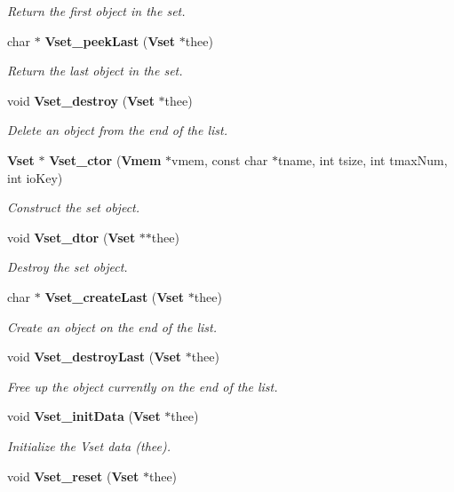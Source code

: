 \begin{DoxyCompactItemize}
\begin{DoxyCompactList}\small\item\em Return the first object in the set. \end{DoxyCompactList}\item 
char $\ast$ {\bf Vset\+\_\+peek\+Last} ({\bf Vset} $\ast$thee)
\begin{DoxyCompactList}\small\item\em Return the last object in the set. \end{DoxyCompactList}\item 
void {\bf Vset\+\_\+destroy} ({\bf Vset} $\ast$thee)
\begin{DoxyCompactList}\small\item\em Delete an object from the end of the list. \end{DoxyCompactList}\item 
{\bf Vset} $\ast$ {\bf Vset\+\_\+ctor} ({\bf Vmem} $\ast$vmem, const char $\ast$tname, int tsize, int tmax\+Num, int io\+Key)
\begin{DoxyCompactList}\small\item\em Construct the set object. \end{DoxyCompactList}\item 
void {\bf Vset\+\_\+dtor} ({\bf Vset} $\ast$$\ast$thee)
\begin{DoxyCompactList}\small\item\em Destroy the set object. \end{DoxyCompactList}\item 
char $\ast$ {\bf Vset\+\_\+create\+Last} ({\bf Vset} $\ast$thee)
\begin{DoxyCompactList}\small\item\em Create an object on the end of the list. \end{DoxyCompactList}\item 
void {\bf Vset\+\_\+destroy\+Last} ({\bf Vset} $\ast$thee)
\begin{DoxyCompactList}\small\item\em Free up the object currently on the end of the list. \end{DoxyCompactList}\item 
void {\bf Vset\+\_\+init\+Data} ({\bf Vset} $\ast$thee)
\begin{DoxyCompactList}\small\item\em Initialize the Vset data (thee). \end{DoxyCompactList}\item 
void {\bf Vset\+\_\+reset} ({\bf Vset} $\ast$thee)
$$
\end{DoxyCompactItemize}
